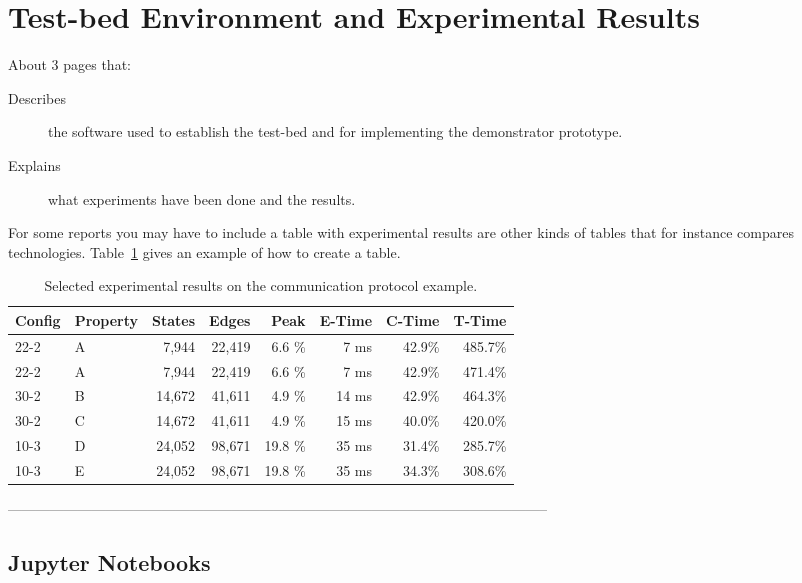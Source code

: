 \section{Test-bed Environment and Experimental Results}
\label{sec:experiments}

About 3 pages that:

\begin{description}

\item[Describes] the software used to establish the test-bed and for implementing the demonstrator prototype.

\item[Explains] what experiments have been done and the results.

\end{description}

For some reports you may have to include a table with experimental
results are other kinds of tables that for instance compares
technologies. Table~\ref{tab:results} gives an example of how to create a table.

\begin{table}
\centering
\begin{tabular}{llrrrrrr}
  Config & Property & States & Edges & Peak & E-Time & C-Time & T-Time
  \\ \hline \hline
22-2 & A   &    7,944  &   22,419  &  6.6  \%  &  7 ms & 42.9\% &  485.7\% \\   
22-2 & A   &    7,944  &   22,419  &  6.6  \%  &  7 ms & 42.9\% &  471.4\% \\   
30-2 & B   &   14,672  &   41,611  &  4.9  \%  & 14 ms & 42.9\% &  464.3\% \\   
30-2 & C   &   14,672  &   41,611  &  4.9  \%  & 15 ms & 40.0\% &  420.0\% \\ \hline
10-3 & D   &   24,052  &   98,671  & 19.8  \%  & 35 ms & 31.4\% &  285.7\% \\   
10-3 & E   &   24,052  &   98,671  & 19.8  \%  & 35 ms & 34.3\% &  308.6\% \\
\hline \hline
\end{tabular}
\caption{Selected experimental results on the communication protocol example.}
\label{tab:results}
\end{table}

--------------------------------------------------------------------------------------------------------------------
\subsection{Jupyter Notebooks}

